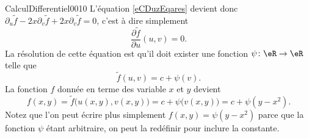 \begin{corrige}{CalculDifferentiel0010}
	L'équation \eqref{eCDuzEqares} devient donc $\partial_u\tilde f-2x\partial_v\tilde f+2x\partial_v\tilde f=0$, c'est à dire simplement
	\begin{equation}
		\frac{ \partial \tilde f }{ \partial u }(u,v)=0.
	\end{equation}
	La résolution de cette équation est qu'il doit exister une fonction $\psi\colon \eR\to \eR$ telle que
	\begin{equation}
		\tilde f(u,v)=c+\psi(v).
	\end{equation}
	La fonction $f$ donnée en terme des variable $x$ et $y$ devient
	\begin{equation}
		f(x,y)=\tilde f\big( u(x,y),v(x,y) \big)=c+\psi\big( v(x,y) \big)=c+\psi(y-x^2).
	\end{equation}
	Notez que l'on peut écrire plus simplement $f(x,y)=\psi(y-x^2)$ parce que la fonction $\psi$ étant arbitraire, on peut la redéfinir pour inclure la constante.

\end{corrige}
